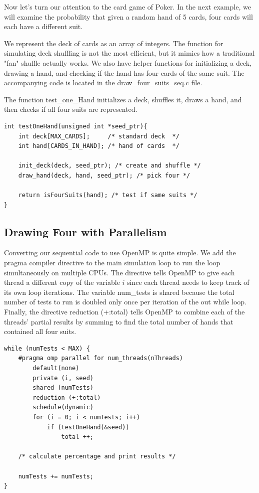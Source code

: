 \documentclass[a4paper, 11pt]{article}
\begin{document}
Now let's turn our attention to the card game of Poker. In the next example, we will examine the probability that given a random hand of 5 cards, four cards will each have a different suit.

We represent the deck of cards as an array of integers. The function for simulating deck shuffling is not the most efficient, but it mimics how a traditional "fan" shuffle actually works. We also have helper functions for initializing a deck, drawing a hand, and checking if the hand has four cards of the same suit. The accompanying code is located in the draw\_four\_suits\_seq.c file.

The function test\_one\_Hand initializes a deck, shuffles it, draws a hand, and then checks if all four suits are represented.

\pagebreak

\lstset{language=C}
\begin{lstlisting}[frame=single]
int testOneHand(unsigned int *seed_ptr){
    int deck[MAX_CARDS];     /* standard deck  */
    int hand[CARDS_IN_HAND]; /* hand of cards  */

    init_deck(deck, seed_ptr); /* create and shuffle */
    draw_hand(deck, hand, seed_ptr); /* pick four */

    return isFourSuits(hand); /* test if same suits */
}
\end{lstlisting}

\subsection{Drawing Four with Parallelism}

Converting our sequential code to use OpenMP is quite simple. We add the pragma compiler directive to the main simulation loop to run the loop simultaneously on multiple CPUs. The directive tells OpenMP to give each thread a different copy of the variable $i$ since each thread needs to keep track of its own loop iterations. The variable num\_tests is shared because the total number of tests to run is doubled only once per iteration of the out while loop. Finally, the directive reduction (+:total) tells OpenMP to combine each of the threads' partial results by summing to find the total number of hands that contained all four suits.

\lstset{language=C}
\begin{lstlisting}[frame=single]
while (numTests < MAX) {
    #pragma omp parallel for num_threads(nThreads)
        default(none)
        private (i, seed)
        shared (numTests)
        reduction (+:total)
        schedule(dynamic)
        for (i = 0; i < numTests; i++)
            if (testOneHand(&seed))
                total ++;
    
    /* calculate percentage and print results */
    
    numTests += numTests;
}
\end{lstlisting}
\end{document}
